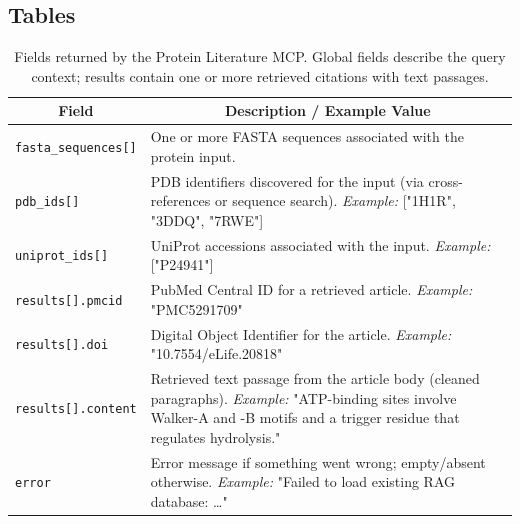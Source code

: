 \documentclass{article}
\begin{document}
\subsection{Tables}
\begin{table}[!htbp]
\caption{Fields returned by the Protein Literature MCP. Global fields describe the query context; results contain one or more retrieved citations with text passages.}
\label{tab:literature-mcp}
\begin{center}
\begin{tabular}{p{3.7cm}p{10cm}}
\toprule
\multicolumn{1}{c}{\bf Field} & \multicolumn{1}{c}{\bf Description / Example Value} \\
\midrule
\texttt{fasta\_sequences[]} & One or more FASTA sequences associated with the protein input. \\
\addlinespace
\texttt{pdb\_ids[]} & PDB identifiers discovered for the input (via cross-references or sequence search). \emph{Example:} ["1H1R", "3DDQ", "7RWE"] \\
\addlinespace
\texttt{uniprot\_ids[]} & UniProt accessions associated with the input. \emph{Example:} ["P24941"] \\
\addlinespace
\texttt{results[].pmcid} & PubMed Central ID for a retrieved article. \emph{Example:} "PMC5291709" \\
\addlinespace
\texttt{results[].doi} & Digital Object Identifier for the article. \emph{Example:} "10.7554/eLife.20818" \\
\addlinespace
\texttt{results[].content} & Retrieved text passage from the article body (cleaned paragraphs). \emph{Example:} "ATP-binding sites involve Walker-A and -B motifs and a trigger residue that regulates hydrolysis." \\
\addlinespace
\texttt{error} & Error message if something went wrong; empty/absent otherwise. \emph{Example:} "Failed to load existing RAG database: …" \\
\bottomrule
\end{tabular}
\end{center}
\end{table}
\end{document}
